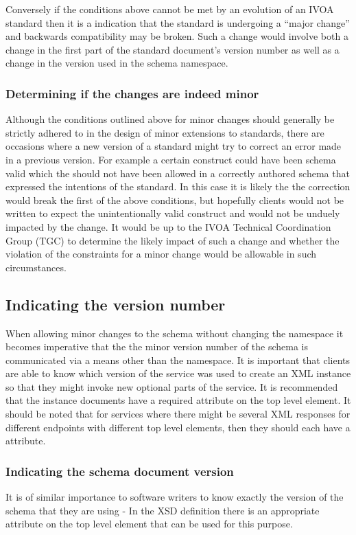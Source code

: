 \documentclass[10pt,a4paper]{ivoa}
\begin{document}
Conversely if the conditions above cannot be met by an evolution of an IVOA
standard then it is a indication that the standard is undergoing a ``major
change'' and backwards compatibility may be broken. Such a change would
involve both a change in the first part of the standard document's version
 number as well as a change in the version used in the schema
namespace.
\subsubsection{Determining if the changes are indeed minor}
Although the conditions outlined above for minor changes should generally be
strictly adhered to in the design of minor extensions to standards, there are
occasions where a new version of a standard might try to correct an error made
in a previous version. For example a certain construct could have been
schema valid which the should not have been allowed in a correctly authored
schema that expressed the intentions of the standard. In this case it is likely
the the correction would break the first of the above conditions, but hopefully
clients would not be written to expect the unintentionally valid construct and
would not be unduely impacted by the change. It would be up to the IVOA
Technical Coordination Group (TGC) to determine the likely impact of such a
change and whether the violation of the constraints for a minor change would be
allowable in such circumstances.

\subsection{Indicating the version number}

When allowing minor changes to the schema without changing the
namespace it becomes imperative that the the minor version number of the schema
is communicated via a means other than the namespace. It is important that
clients are able to know which version of the service was used to create an XML
instance so that they might invoke new optional parts of the service. It is
recommended that the instance documents have a required 
attribute on the top level element. It should be noted that for services where
there might be several XML responses for different endpoints with different top
level elements, then they should each have a  attribute.

\subsubsection{Indicating the schema document version}
It is of similar importance to software writers to know exactly the version of
the schema that they are using - In the XSD definition there is an appropriate
 attribute on the top level  element that can be
used for this purpose.
\end{document}
